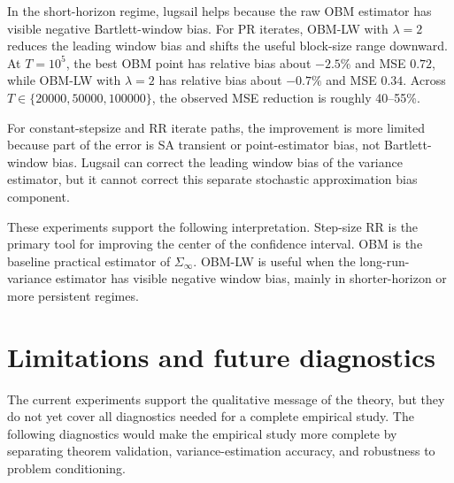 In the short-horizon regime, lugsail helps because the raw OBM estimator has
visible negative Bartlett-window bias. For PR iterates, OBM-LW with
$\lambda=2$ reduces the leading window bias and shifts the useful block-size
range downward. At $T=10^5$, the best OBM point has relative bias about
$-2.5\%$ and MSE $0.72$, while OBM-LW with $\lambda=2$ has relative bias
about $-0.7\%$ and MSE $0.34$. Across
$T\in\{20000,50000,100000\}$, the observed MSE reduction is roughly
40--55\%.

For constant-stepsize and RR iterate paths, the improvement is more limited
because part of the error is SA transient or point-estimator bias, not
Bartlett-window bias. Lugsail can correct the leading window bias of the
variance estimator, but it cannot correct this separate stochastic
approximation bias component.

These experiments support the following interpretation. Step-size RR is the
primary tool for improving the center of the confidence interval. OBM is the
baseline practical estimator of $\Sigma_\infty$. OBM-LW is useful when the
long-run-variance estimator has visible negative window bias, mainly in
shorter-horizon or more persistent regimes.

\section{Limitations and future diagnostics}

The current experiments support the qualitative message of the theory, but
they do not yet cover all diagnostics needed for a complete empirical study.
The following diagnostics would make the empirical study more complete by
separating theorem validation, variance-estimation accuracy, and robustness
to problem conditioning.

